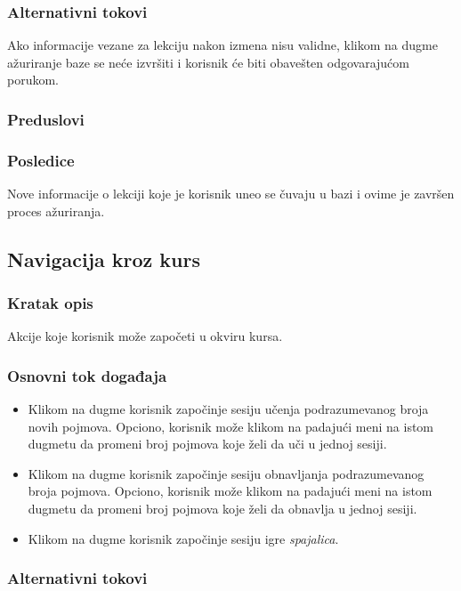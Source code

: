 \subsubsection{Alternativni tokovi}
Ako informacije vezane za lekciju nakon izmena nisu validne, klikom na dugme \SaveButton{} ažuriranje baze se neće izvršiti i korisnik će biti obavešten odgovarajućom porukom.
\subsubsection{Preduslovi}

\subsubsection{Posledice}
Nove informacije o lekciji koje je korisnik uneo se čuvaju u bazi i ovime je završen proces ažuriranja.

\subsection{Navigacija kroz kurs}
\label{subsec:navigacija-kroz-kurs}

\subsubsection{Kratak opis}
Akcije koje korisnik može započeti u okviru kursa.
\subsubsection{Osnovni tok događaja}
\begin{itemize}
  \item Klikom na dugme  korisnik započinje sesiju učenja podrazumevanog broja novih pojmova.
  Opciono, korisnik može klikom na padajući meni na istom dugmetu da promeni broj pojmova koje želi da uči u jednoj sesiji.
  \item Klikom na dugme  korisnik započinje sesiju obnavljanja podrazumevanog broja pojmova.
  Opciono, korisnik može klikom na padajući meni na istom dugmetu da promeni broj pojmova koje želi da obnavlja u jednoj sesiji.
  \item Klikom na dugme  korisnik započinje sesiju igre \emph{spajalica}.
\end{itemize}
\subsubsection{Alternativni tokovi}


